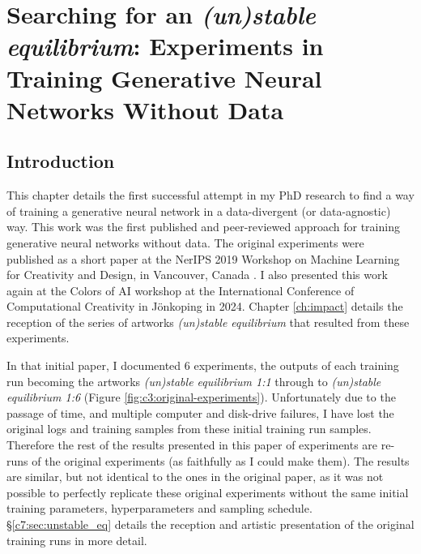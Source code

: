 \chapter{Searching for an \textit{(un)stable equilibrium}:
Experiments in Training Generative Neural Networks Without Data}
\label{ch:unstable_eq}

\section{Introduction}

This chapter details the first successful attempt in my PhD research to find a way of training a generative neural network in a data-divergent (or data-agnostic) way. 
This work was the first published and peer-reviewed approach for training generative neural networks without data.
The original experiments were published as a short paper at the NerIPS 2019 Workshop on Machine Learning for Creativity and Design, in Vancouver, Canada \citep{broad2019searching}. 
I also presented this work again at the Colors of AI workshop at the International Conference of Computational Creativity in Jönkoping in 2024.
Chapter \ref{ch:impact} details the reception of the series of artworks \textit{(un)stable equilibrium} that resulted from these experiments. 

In that initial paper, I documented 6 experiments, the outputs of each training run becoming the artworks \textit{(un)stable equilibrium 1:1} through to \textit{(un)stable equilibrium 1:6} (Figure \ref{fig:c3:original-experiments}). Unfortunately due to the passage of time, and multiple computer and disk-drive failures, I have lost the original logs and training samples from these initial training run samples. 
Therefore the rest of the results presented in this paper of experiments are re-runs of the original experiments (as faithfully as I could make them). The results are similar, but not identical to the ones in the original paper, as it was not possible to perfectly replicate these original experiments without the same initial training parameters, hyperparameters and sampling schedule. \S \ref{c7:sec:unstable_eq} details the reception and artistic presentation of the original training runs in more detail. 

